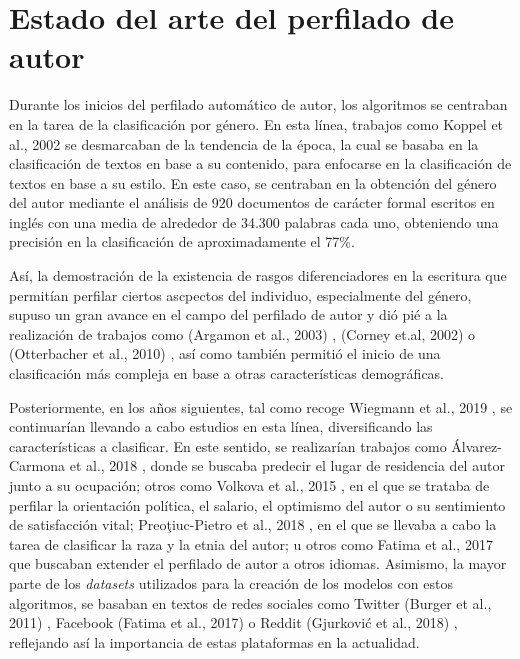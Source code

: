 \chapter{Estado del arte del perfilado de autor}
\label{chap:estadoarte}

Durante los inicios del perfilado automático de autor, los algoritmos se centraban en la tarea de la clasificación por género.
En esta línea, trabajos como Koppel et al., 2002 \cite{koppel2002automatically} se desmarcaban de la tendencia de la época,
la cual se basaba en la clasificación de textos en base a su contenido, para enfocarse en la clasificación de textos en base a su estilo.
En este caso, se centraban en la obtención del género del autor mediante el análisis
de 920 documentos de carácter formal escritos en inglés con una media de alrededor de 34.300 palabras cada uno, obteniendo una precisión en la clasificación de
aproximadamente el 77\%.

\bigskip
Así, la demostración de la existencia de rasgos diferenciadores en la escritura que permitían perfilar ciertos ascpectos del individuo, especialmente del género, 
supuso un gran avance en el campo del perfilado de autor
y dió pié a la realización de trabajos como (Argamon et al., 2003) \cite{argamon2003gender}, (Corney et.al, 2002) \cite{corney2002gender} o (Otterbacher et al., 2010) \cite{otterbacher2010inferring}, 
así como también permitió el inicio de una clasificación más compleja en base a otras características demográficas.

\bigskip
Posteriormente, en los años siguientes, tal como recoge Wiegmann et al., 2019 \cite{wiegmann2019overview}, se continuarían llevando a cabo estudios en esta línea, diversificando
las características a clasificar. En este sentido, se realizarían trabajos como Álvarez-Carmona et al., 2018 \cite{alvarez2018overview}, donde se buscaba
predecir el lugar de residencia del autor junto a su ocupación; otros como Volkova et al., 2015 \cite{volkova2015predicting}, en el que se trataba de perfilar la orientación política,
el salario, el optimismo del autor o su sentimiento de satisfacción vital; Preoţiuc-Pietro et al., 2018 \cite{preoctiuc2018user}, en el que se llevaba a cabo la tarea de
clasificar la raza y la etnia del autor; u otros como Fatima et al., 2017 \cite{fatima2017multilingual} que buscaban extender el perfilado de autor a otros idiomas. Asimismo,
la mayor parte de los \textit{datasets} utilizados para la creación de los modelos con estos algoritmos, se basaban en textos de redes sociales como Twitter (Burger et al., 2011) \cite{burger2011discriminating},
Facebook (Fatima et al., 2017) \cite{fatima2017multilingual} o Reddit (Gjurković et al., 2018) \cite{gjurkovic2018reddit}, reflejando así la importancia de estas plataformas
en la actualidad.

